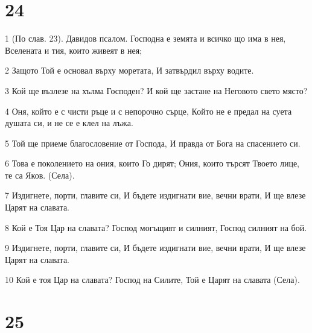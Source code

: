 \chapter{24}

\par 1 (По слав. 23). Давидов псалом. Господна е земята и всичко що има в нея, Вселената и тия, които живеят в нея;
\par 2 Защото Той е основал върху моретата, И затвърдил върху водите.
\par 3 Кой ще възлезе на хълма Господен? И кой ще застане на Неговото свето място?
\par 4 Оня, който е с чисти ръце и с непорочно сърце, Който не е предал на суета душата си, и не се е клел на лъжа.
\par 5 Той ще приеме благословение от Господа, И правда от Бога на спасението си.
\par 6 Това е поколението на ония, които Го дирят; Ония, които търсят Твоето лице, те са Яков. (Села).
\par 7 Издигнете, порти, главите си, И бъдете издигнати вие, вечни врати, И ще влезе Царят на славата.
\par 8 Кой е Тоя Цар на славата? Господ могъщият и силният, Господ силният на бой.
\par 9 Издигнете, порти, главите си, И бъдете издигнати вие, вечни врати, И ще влезе Царят на славата.
\par 10 Кой е тоя Цар на славата? Господ на Силите, Той е Царят на славата (Села).

\chapter{25}

